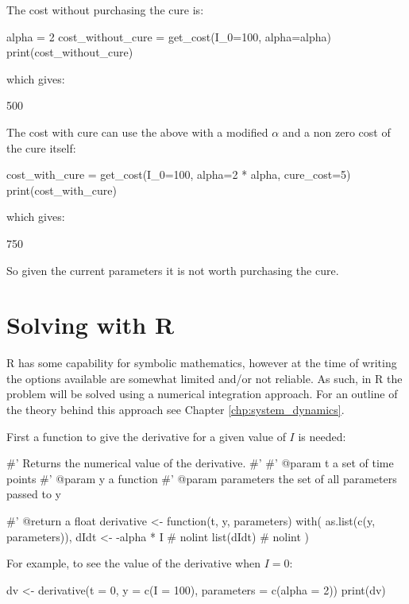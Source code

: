 The cost without purchasing the cure is:

\begin{pyin}
alpha = 2
cost_without_cure = get_cost(I_0=100, alpha=alpha)
print(cost_without_cure)
\end{pyin}

which gives:

\begin{pyout}
500
\end{pyout}


The cost with cure can use the above with a modified \(\alpha\) and a non zero
cost of the cure itself:

\begin{pyin}
cost_with_cure = get_cost(I_0=100, alpha=2 * alpha, cure_cost=5)
print(cost_with_cure)
\end{pyin}

which gives:

\begin{pyout}
750
\end{pyout}

So given the current parameters it is not worth purchasing the cure.

\section{Solving with R}\label{sec:differential_equations_solving-with-R}

R has some capability for symbolic mathematics, however at the time of writing
the options available are somewhat limited and/or not reliable. As such, in R
the problem will be solved using a numerical integration approach. For an
outline of the theory behind this approach see Chapter
\ref{chp:system_dynamics}.

First a function to give the derivative for a given value of \(I\) is needed:

\begin{Rin}
#' Returns the numerical value of the derivative.
#'
#' @param t a set of time points
#' @param y a function
#' @param parameters the set of all parameters passed to y

#' @return a float
derivative <- function(t, y, parameters) {
  with(
    as.list(c(y, parameters)), {
      dIdt <- -alpha * I  # nolint
      list(dIdt)  # nolint
    }
  )
}
\end{Rin}

For example, to see the value of the derivative when \(I=0\):

\begin{Rin}
dv <- derivative(t = 0, y = c(I = 100), parameters = c(alpha = 2))
print(dv)
\end{Rin}

